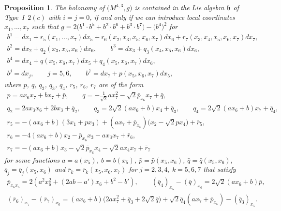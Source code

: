 \documentclass[pdftex]{sigma}
\numberwithin{equation}{section}
\newtheorem{Proposition}[Theorem]{Proposition}
 { \theoremstyle{definition}
\newtheorem{Definition}[Theorem]{Definition}
\newtheorem{Example}[Theorem]{Example}
\newtheorem{Remark}[Theorem]{Remark} }
\newcommand\fh{{\frak h}}
\begin{document}
\begin{Proposition} \label{P36} The holonomy of $\big(M^{4,3},g\big)$ is contained in the Lie algebra $\fh$ of Type~I~$2(c)$ with $i=j=0$, if and only if we can introduce local coordinates $x_1,\dots,x_7$ such that $g=2\big(b^1\cdot b^5+b^2\cdot b^6+b^3\cdot b^7\big)- \big(b^4\big)^2$ for
\begin{gather*}
b^1= dx_1 + r_5(x_1,\dots, x_7)dx_5+r_6(x_2,x_3,x_5,x_6,x_7)dx_6+r_7(x_3,x_4,x_5,x_6,x_7)dx_7, \\
b^2= dx_2+q_2(x_3,x_5,x_6)dx_6, \qquad b^3= dx_3+q_3(x_4,x_5,x_6) dx_6, \\
b^4= dx_4+ q(x_5,x_6,x_7)dx_5+q_4(x_5,x_6,x_7)dx_6, \\
b^j= dx_j,\qquad j=5,6, \qquad
b^7= dx_7 +p(x_5,x_6,x_7)dx_5,
\end{gather*}
where $p$, $q$, $q_2$, $q_3$, $q_4$, $r_5$, $r_6$, $r_7$ are of the form
\begin{gather*}
p = ax_6x_7+bx_7+\bar p,\qquad
q = -\tfrac1{\sqrt 2} ax_7^2 -\sqrt 2 \bar p_{x_6}x_7+\bar q, \\
q_2 = 2ax_3x_6 +2bx_3+\bar q_2,\qquad
q_3= 2\sqrt 2 (ax_6+b) x_4+\bar q_3, \qquad
q_4 = 2\sqrt 2 (ax_6+b) x_7+\bar q_4, \\
r_5=-(ax_6+b)(3x_1+px_3)+(ax_7+\bar p_{x_6})\big(x_2-\sqrt2 px_4\big)+\bar r_5, \\
r_6=-4(ax_6+b)x_2-\bar p_{x_6}x_3-ax_3x_7+\bar r_6, \\
r_7=-(ax_6+b)x_3-\sqrt2 \bar p_{x_6}x_4-\sqrt2 ax_4 x_7+\bar r_7
\end{gather*}
for some functions $a=a(x_5)$, $b=b(x_5)$, $\bar p=\bar p(x_5,x_6)$, $\bar q=\bar q(x_5,x_6)$, $\bar q_j=\bar q_j(x_5,x_6)$ and $\bar r_k=\bar r_k(x_5,x_6,x_7)$ for $j=2,3,4$, $k=5,6,7$ that satisfy
\begin{gather*}
\bar p_{x_6 x_6}=2(a^2x_6^2+(2ab-a')x_6+b^2-b'), \qquad
(\bar q_4)_{x_5}-(\bar q)_{x_6}=2\sqrt 2(ax_6+b)\bar p,\\
(\bar r_6)_{x_7}-(\bar r_7)_{x_6}=(ax_6+b)\big(2ax_7^2+\bar q_3+2\sqrt2 \bar q\big)+\sqrt2 \bar q_4(ax_7+\bar p_{x_6} )-(\bar q_3)_{x_5}.
\end{gather*}
\end{Proposition}
\end{document}
